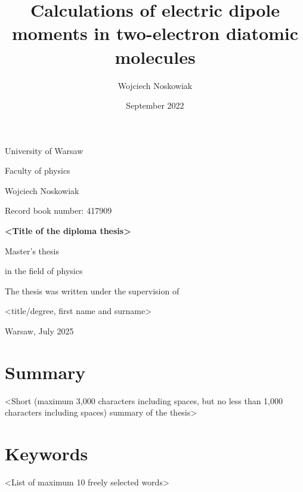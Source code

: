 \documentclass{pracalicmgr}
\author{Wojciech Noskowiak}
\title{Calculations of electric dipole moments in two-electron diatomic molecules}
\date{September 2022}
\begin{document}
\maketitle
\let\cleardoublepage\clearpage

\begin{titlepage}
    \centering
    {\Large University of Warsaw \par}
    {\large Faculty of physics \par}
    \vspace{2cm}
    {\large Wojciech Noskowiak \par}
    {\large Record book number: 417909 \par}
    \vspace{2cm}
    {\Huge \textbf{<Title of the diploma thesis>} \par}
    \vspace{2cm}
    {\medium Master's thesis \par}
    {\medium in the field of physics \par}
    \vspace{2cm}
    \begin{flushright} %
        {\medium The thesis was written under the supervision of \par}
        {\medium <title/degree, first name and surname> \par}
        { \par}
    \end{flushright}
    \vfill
    {\large Warsaw, July 2025 \par}
\end{titlepage}
\restoregeometry

\newpage

\section*{Summary}
<Short (maximum 3,000 characters including spaces, but no less than 1,000 characters including spaces) summary of the thesis>

\section*{Keywords}
<List of maximum 10 freely selected words>

\end{document}
